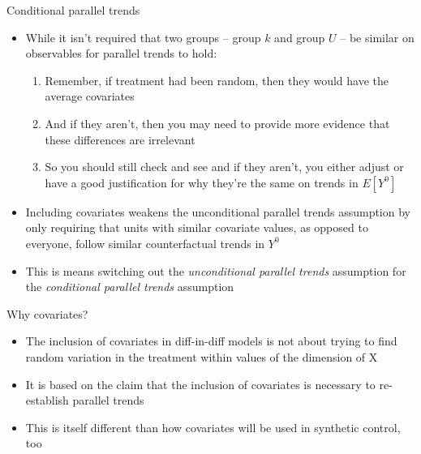 \documentclass{beamer}
\begin{document}
\begin{frame}{Conditional parallel trends}

\begin{itemize}

\item While it isn't required that two groups -- group $k$ and group $U$ -- be similar on observables for parallel trends to hold:

	\begin{enumerate}
	\item Remember, if treatment had been random, then they would have the average covariates
	\item And if they aren't, then you may need to provide more evidence that these differences are irrelevant
	\item So you should still check and see and if they aren't, you either adjust or have a good justification for why they're the same on trends in $E[Y^0]$ 
	\end{enumerate}
	
\item Including covariates weakens the unconditional parallel trends assumption by only requiring that units with similar covariate values, as opposed to everyone, follow similar counterfactual trends in $Y^0$
\item This is means switching out the \emph{unconditional parallel trends} assumption for the \emph{conditional parallel trends} assumption

\end{itemize}

\end{frame}

\begin{frame}{Why covariates?}

\begin{itemize}

\item The inclusion of covariates in diff-in-diff models is not about trying to find random variation in the treatment within values of the dimension of X
\item It is based on the claim that the inclusion of covariates is necessary to re-establish parallel trends
\item This is itself different than how covariates will be used in synthetic control, too
\end{itemize}

\end{frame}
\end{document}

